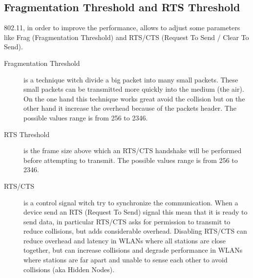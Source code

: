 	
	\subsection{Fragmentation Threshold and RTS Threshold} \label{theory:frag_rts}
	
	802.11, in order to improve the performance, allows to adjust some parameters like Frag (Fragmentation Threshold) and RTS/CTS (Request To Send / Clear To Send).
	
	\begin{description}
		\item[Fragmentation Threshold] is a technique witch divide a big packet into many small packets. These small packets can be transmitted more quickly into the medium (the air). On the one hand this technique works great avoid the collision but on the other hand it increase the overhead because of the packets header. The possible values range is from 256 to 2346.
	
		\item[RTS Threshold] is the frame size above which an RTS/CTS handshake will be performed before attempting to transmit. The possible values range is from 256 to 2346.
	
		\item[RTS/CTS] is a control signal witch try to synchronize the communication. When a device send an RTS (Request To Send) signal this mean that it is ready to send data, in particular RTS/CTS asks for permission to transmit to reduce collisions, but adds considerable overhead. Disabling RTS/CTS can reduce overhead and latency in WLANs where all stations are close together, but can increase collisions and degrade performance in WLANs where stations are far apart and unable to sense each other to avoid collisions (aka Hidden Nodes).
	\end{description}


	








